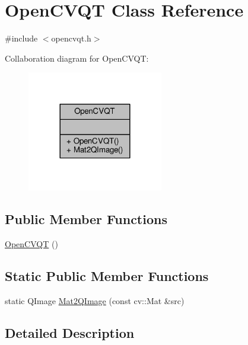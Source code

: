 \hypertarget{class_open_c_v_q_t}{}\section{Open\+C\+V\+Q\+T Class Reference}
\label{class_open_c_v_q_t}


{\ttfamily \#include $<$opencvqt.\+h$>$}



Collaboration diagram for Open\+C\+V\+Q\+T\+:\nopagebreak
\begin{figure}[H]
\begin{center}
\leavevmode
\includegraphics[width=168pt]{class_open_c_v_q_t__coll__graph}
\end{center}
\end{figure}
\subsection*{Public Member Functions}
\begin{DoxyCompactItemize}
\item 
\hyperlink{class_open_c_v_q_t_a34d38b2b4394ced620283754a881bbe3}{Open\+C\+V\+Q\+T} ()
\end{DoxyCompactItemize}
\subsection*{Static Public Member Functions}
\begin{DoxyCompactItemize}
\item 
static Q\+Image \hyperlink{class_open_c_v_q_t_aed2deb7932b122f110cb651747d6d81b}{Mat2\+Q\+Image} (const cv\+::\+Mat \&src)
\end{DoxyCompactItemize}


\subsection{Detailed Description}


